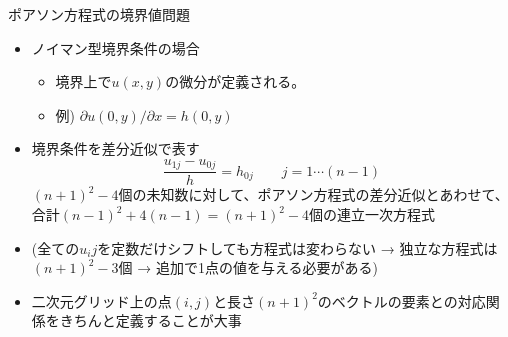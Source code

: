 \begin{frame}[t,fragile]{ポアソン方程式の境界値問題}
  \begin{itemize}
  \item ノイマン型境界条件の場合
    \begin{itemize}
    \item 境界上で$u(x,y)$の微分が定義される。
    \item 例) $\partial u(0,y) / \partial x = h(0,y)$
    \end{itemize}
  \item 境界条件を差分近似で表す
    \[
    \frac{u_{1j} - u_{0j}}{h} = h_{0j} \qquad j=1 \cdots (n-1)
    \]
    $(n+1)^2-4$個の未知数に対して、ポアソン方程式の差分近似とあわせて、合計$(n-1)^2+4(n-1)=(n+1)^2-4$個の連立一次方程式
  \item (全ての$u_ij$を定数だけシフトしても方程式は変わらない → 独立な方程式は\((n+1)^2-3\)個 → 追加で1点の値を与える必要がある) \\[2em]
  \item 二次元グリッド上の点$(i,j)$と長さ$(n+1)^2$のベクトルの要素との対応関係をきちんと定義することが大事
  \end{itemize}
\end{frame}
